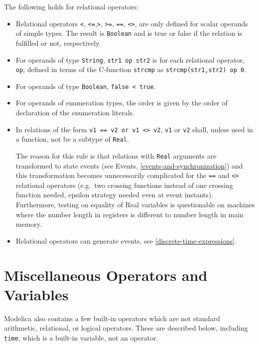 The following holds for relational operators:
\begin{itemize}
\item
  Relational operators \lstinline!<!, \lstinline!<=!,\lstinline!>!,
\lstinline!>=!, \lstinline!==!, \lstinline!<>!, are only defined for
  scalar operands of simple types. The result is \lstinline!Boolean! and is true or
  false if the relation is fulfilled or not, respectively.
\item
  For operands of type \lstinline!String!, \lstinline!str1 op str2! is for each relational
  operator, \lstinline!op!, defined in terms of the C-function \lstinline!strcmp! as
  \lstinline!strcmp(str1,str2) op 0!.
\item
  For operands of type \lstinline!Boolean!, \lstinline!false < true!.
\item
  For operands of enumeration types, the order is given by the order of
  declaration of the enumeration literals.
\item
  In relations of the form \lstinline!v1 == v2 or v1 <> v2!,
  \lstinline!v1! or \lstinline!v2! shall, unless used in a function, not be a subtype of \lstinline!Real!.
  \begin{nonnormative}
  The reason for this rule is that relations with \lstinline!Real! arguments are transformed to state events (see Events, \cref{events-and-synchronization})
  and this transformation becomes unnecessarily complicated for the \lstinline!==! and \lstinline!<>! relational operators (e.g.\ two crossing functions instead
  of one crossing function needed, epsilon strategy needed even at event instants). Furthermore, testing on equality of Real variables is questionable on machines
  where the number length in registers is different to number length in main memory.
  \end{nonnormative}
\item
  Relational operators can generate events, see \cref{discrete-time-expressions}.
\end{itemize}

\section{Miscellaneous Operators and Variables}\label{miscellaneous-operators-and-variables}

Modelica also contains a few built-in operators which are not standard
arithmetic, relational, or logical operators. These are described below,
including \lstinline!time!, which is a built-in variable, not an operator.

